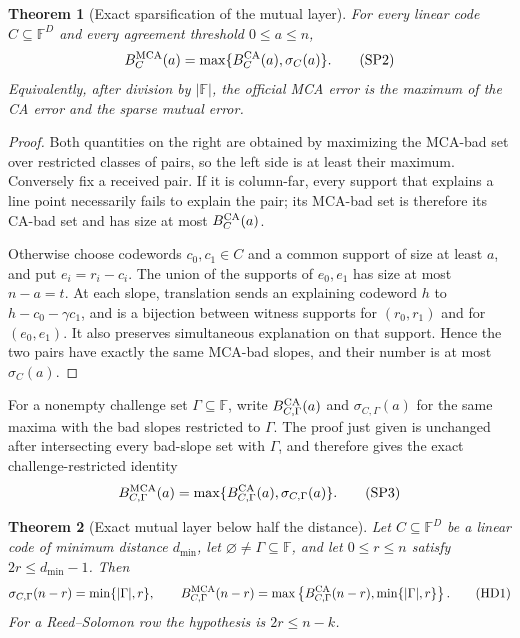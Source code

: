 \documentclass[11pt,a4paper]{amsart}
\numberwithin{equation}{section}
\newtheorem{theorem}{Theorem}[section]
\theoremstyle{remark}
\newcommand{\F}{\mathbb F}
\newcommand{\abs}[1]{\lvert #1\rvert}
\begin{document}
\begin{theorem}[Exact sparsification of the mutual layer]
\label{thm:exact-sparsification}
For every linear code \(C\subseteq\F^D\) and every agreement threshold
\(0\le a\le n\),
\[
 B_C^{\rm MCA}(a)=
 \max\{B_C^{\rm CA}(a),\sigma_C(a)\}.              \tag{SP2}
\label{eq:exact-sparsification}
\]
Equivalently, after division by \(\abs\F\), the official MCA error is the
maximum of the CA error and the sparse mutual error.
\end{theorem}

\begin{proof}
Both quantities on the right are obtained by maximizing the MCA-bad set
over restricted classes of pairs, so the left side is at least their
maximum.  Conversely fix a received pair.  If it is column-far, every
support that explains a line point necessarily fails to explain the pair;
its MCA-bad set is therefore its CA-bad set and has size at most
\(B_C^{\rm CA}(a)\).

Otherwise choose codewords \(c_0,c_1\in C\) and a common support of size
at least \(a\), and put \(e_i=r_i-c_i\).  The union of the supports of
\(e_0,e_1\) has size at most \(n-a=t\).  At each slope, translation sends
an explaining codeword \(h\) to
\(h-c_0-\gamma c_1\), and is a bijection between witness supports for
\((r_0,r_1)\) and for \((e_0,e_1)\).  It also preserves simultaneous
explanation on that support.  Hence the two pairs have exactly the same
MCA-bad slopes, and their number is at most \(\sigma_C(a)\).
\end{proof}

For a nonempty challenge set \(\Gamma\subseteq\F\), write
\(B_{C,\Gamma}^{\rm CA}(a)\) and \(\sigma_{C,\Gamma}(a)\) for the same
maxima with the bad slopes restricted to \(\Gamma\).  The proof just given
is unchanged after intersecting every bad-slope set with \(\Gamma\), and
therefore gives the exact challenge-restricted identity
\[
 B_{C,\Gamma}^{\rm MCA}(a)
 =\max\{B_{C,\Gamma}^{\rm CA}(a),\sigma_{C,\Gamma}(a)\}.
 \tag{SP3}\label{eq:challenge-sparsification}
\]

\begin{theorem}[Exact mutual layer below half the distance]
\label{thm:exact-half-distance-sparse}
Let \(C\subseteq\F^D\) be a linear code of minimum distance
\(d_{\min}\), let \(\varnothing\ne\Gamma\subseteq\F\), and let
\(0\le r\le n\) satisfy \(2r\le d_{\min}-1\).  Then
\[
 \sigma_{C,\Gamma}(n-r)=\min\{\abs\Gamma,r\},
 \qquad
 B_{C,\Gamma}^{\rm MCA}(n-r)
 =\max\left\{B_{C,\Gamma}^{\rm CA}(n-r),
              \min\{\abs\Gamma,r\}\right\}.       \tag{HD1}
\label{eq:exact-half-distance-sparse}
\]
For a Reed--Solomon row the hypothesis is \(2r\le n-k\).
\end{theorem}
\end{document}
